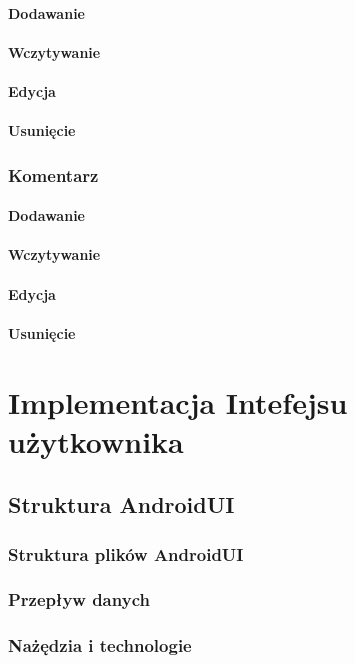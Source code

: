\paragraph{Dodawanie}
\paragraph{Wczytywanie}
\paragraph{Edycja}
\paragraph{Usunięcie}
\subsubsection{Komentarz}
\paragraph{Dodawanie}
\paragraph{Wczytywanie}
\paragraph{Edycja}
\paragraph{Usunięcie}
%
\section{Implementacja Intefejsu użytkownika}
\subsection{Struktura AndroidUI}
\subsubsection{Struktura plików AndroidUI}
\subsubsection{Przepływ danych}
\subsubsection{Nażędzia i technologie}
